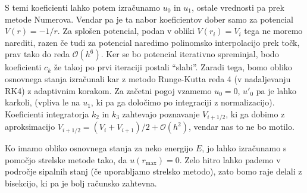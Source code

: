 \documentclass[12pt, a4 paper]{article}
\begin{document}
S temi koeficienti lahko potem izra\v cunamo $u_0$ in $u_1$, ostale vrednosti pa prek metode Numerova. Vendar pa
je ta nabor koeficientov dober samo za potencial $V(r) = -1/r$. Za splo\v sen potencial, podan v obliki
$V(r_i) = V_i$ tega ne moremo narediti, razen \v ce tudi za potencial naredimo polinomsko interpolacijo prek
to\v ck, prav tako do reda $\mathcal{O}(h^6)$. Ker se bo potencial iterativno spreminjal, bodo koeficienti
$c_k$ \v ze takoj po prvi iteraciji postali "`slabi"'. Zaradi tega, bomo obliko osnovnega stanja izra\v cunali
kar z metodo Runge-Kutta reda 4 (v nadaljevanju RK4) z adaptivnim korakom. Za za\v cetni pogoj vzamemo $u_0 = 0$,
$u'_0$ pa je lahko karkoli, (vpliva le na $u_1$, ki pa ga dolo\v cimo po integraciji z normalizacijo). Koeficienti
integratorja $k_2$ in $k_3$ zahtevajo poznavanje $V_{i+1/2}$, ki ga dobimo z aproksimacijo $V_{i+1/2} =
(V_i + V_{i+1})/2 + \mathcal{O}(h^2)$, vendar nas to ne bo motilo.

Ko imamo obliko osnovnega stanja za neko energijo $E$, jo lahko izra\v cunamo s pomo\v cjo strelske metode
tako, da $u(r_\text{max}) = 0$. Zelo hitro lahko pademo v podro\v cje sipalnih stanj (\v ce uporabljamo strelsko
metodo), zato bomo raje delali z bisekcijo, ki pa je bolj ra\v cunsko zahtevna.
\end{document}

